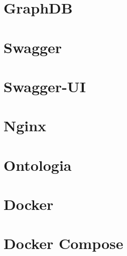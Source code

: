 
\section{GraphDB}

\section{Swagger}

\section{Swagger-UI}




\section{Nginx}
\cite{nginxcook}

\section{Ontologia}
\cite{bontology}

\section{Docker}
\cite{udocker}

\section{Docker Compose}
\cite{udocker}
